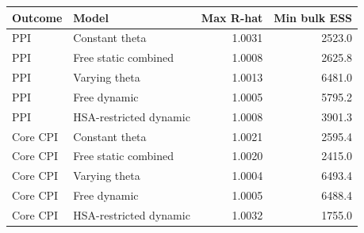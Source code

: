 \begin{tabular}{@{}llrr@{}}
\toprule
Outcome & Model & Max R-hat & Min bulk ESS \\
\midrule
PPI & Constant theta & 1.0031 & 2523.0 \\
PPI & Free static combined & 1.0008 & 2625.8 \\
PPI & Varying theta & 1.0013 & 6481.0 \\
PPI & Free dynamic & 1.0005 & 5795.2 \\
PPI & HSA-restricted dynamic & 1.0008 & 3901.3 \\
Core CPI & Constant theta & 1.0021 & 2595.4 \\
Core CPI & Free static combined & 1.0020 & 2415.0 \\
Core CPI & Varying theta & 1.0004 & 6493.4 \\
Core CPI & Free dynamic & 1.0005 & 6488.4 \\
Core CPI & HSA-restricted dynamic & 1.0032 & 1755.0 \\
\bottomrule
\end{tabular}
